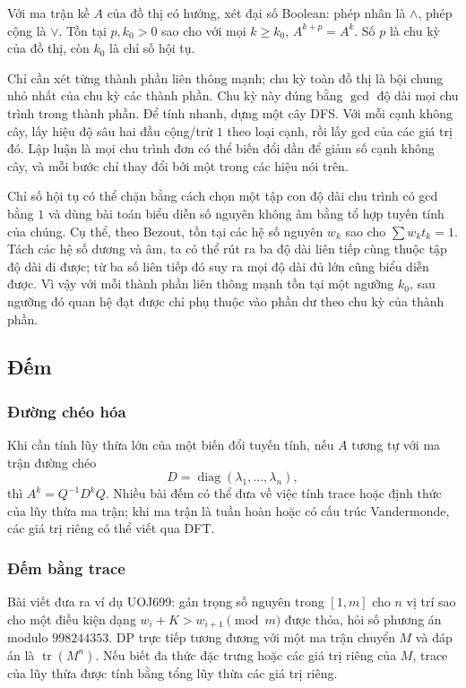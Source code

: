 \documentclass[11pt]{article}
\begin{document}
Với ma trận kề $A$ của đồ thị có hướng, xét đại số Boolean: phép nhân là
\(\land\), phép cộng là \(\lor\). Tồn tại $p,k_0>0$ sao cho với mọi
$k\ge k_0$, $A^{k+p}=A^k$. Số $p$ là chu kỳ của đồ thị, còn $k_0$ là chỉ số hội
tụ.

Chỉ cần xét từng thành phần liên thông mạnh; chu kỳ toàn đồ thị là bội chung nhỏ
nhất của chu kỳ các thành phần. Chu kỳ này đúng bằng $\gcd$ độ dài mọi chu trình
trong thành phần. Để tính nhanh, dựng một cây DFS. Với mỗi cạnh không cây, lấy
hiệu độ sâu hai đầu cộng/trừ $1$ theo loại cạnh, rồi lấy gcd của các giá trị đó.
Lập luận là mọi chu trình đơn có thể biến đổi dần để giảm số cạnh không cây, và
mỗi bước chỉ thay đổi bởi một trong các hiệu nói trên.

Chỉ số hội tụ có thể chặn bằng cách chọn một tập con độ dài chu trình có gcd
bằng \(1\) và dùng bài toán biểu diễn số nguyên không âm bằng tổ hợp tuyến tính
của chúng. Cụ thể, theo Bezout, tồn tại các hệ số nguyên \(w_k\) sao cho
\(\sum w_k t_k=1\). Tách các hệ số dương và âm, ta có thể rút ra ba độ dài liên
tiếp cùng thuộc tập độ dài đi được; từ ba số liên tiếp đó suy ra mọi độ dài đủ
lớn cũng biểu diễn được. Vì vậy với mỗi thành phần liên thông mạnh tồn tại một
ngưỡng \(k_0\), sau ngưỡng đó quan hệ đạt được chỉ phụ thuộc vào phần dư theo
chu kỳ của thành phần.

\subsection{Đếm}

\subsubsection{Đường chéo hóa}

Khi cần tính lũy thừa lớn của một biến đổi tuyến tính, nếu
$A$ tương tự với ma trận đường chéo
\[
  D=\operatorname{diag}(\lambda_1,\ldots,\lambda_n),
\]
thì $A^k=Q^{-1}D^kQ$. Nhiều bài đếm có thể đưa về việc tính trace hoặc định thức
của lũy thừa ma trận; khi ma trận là tuần hoàn hoặc có cấu trúc Vandermonde, các
giá trị riêng có thể viết qua DFT.

\subsubsection{Đếm bằng trace}

Bài viết đưa ra ví dụ UOJ699: gán trọng số nguyên trong $[1,m]$ cho $n$ vị trí
sao cho một điều kiện dạng $w_i+K>w_{i+1}\pmod m$ được thỏa, hỏi số phương án
modulo $998244353$. DP trực tiếp tương đương với một ma trận chuyển $M$ và đáp
án là $\operatorname{tr}(M^n)$. Nếu biết đa thức đặc trưng hoặc các giá trị riêng
của $M$, trace của lũy thừa được tính bằng tổng lũy thừa các giá trị riêng.
\end{document}
